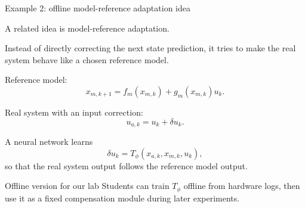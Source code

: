 \documentclass[aspectratio=169]{beamer}
\begin{document}
\begin{frame}{Example 2: offline model-reference adaptation idea}

A related idea is model-reference adaptation.

\vspace{-0.05cm}

Instead of directly correcting the next state prediction, it tries to make the real system behave like a chosen reference model.

\vspace{-0.05cm}
Reference model:
\[
x_{m,k+1}=f_m(x_{m,k})+g_m(x_{m,k})u_k.
\]

Real system with an input correction:
\[
u_{a,k}=u_k+\delta u_k.
\]

A neural network learns
\[
\delta u_k=T_\phi(x_{a,k},x_{m,k},u_k),
\]
so that the real system output follows the reference model output.
\vspace{-0.05cm}


\begin{block}{Offline version for our lab}
\small
Students can train \(T_\phi\) offline from hardware logs, then use it as a fixed compensation module during later experiments.
\end{block}

\end{frame}
\end{document}
